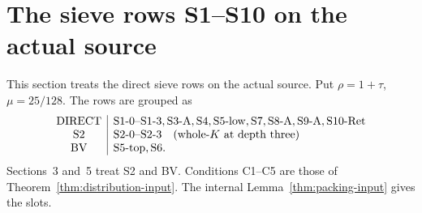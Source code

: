 \section{The sieve rows S1--S10 on the actual source}
\label{p2:sec:rows}
This section treats the direct sieve rows on the actual source.
Put $\rho=1+\tau$, $\mu=25/128$. The rows are grouped as
\[
\begin{array}{c|l}
\mathrm{DIRECT}&\mathrm{S1\hbox{-}0\hbox{--}S1\hbox{-}3,S3\hbox{-}A,S4,S5\hbox{-}low,S7,S8\hbox{-}A,S9\hbox{-}A,S10\hbox{-}Ret}\\
\mathrm{S2}&\mathrm{S2\hbox{-}0\hbox{--}S2\hbox{-}3}\quad\text{(whole-$K$ at depth three)}\\
\mathrm{BV}&\mathrm{S5\hbox{-}top,S6}.
\end{array}
\]
Sections~3 and~5 treat S2 and BV.
Conditions C1--C5 are those of Theorem~\ref{thm:distribution-input}.
The internal Lemma~\ref{thm:packing-input} gives the slots.

